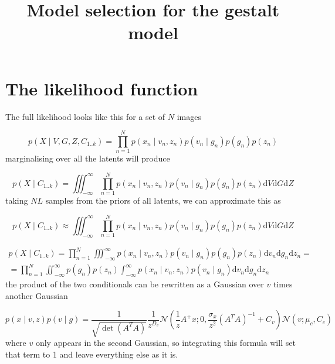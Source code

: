 \documentclass{paper}
\begin{document}
\title{Model selection for the gestalt model}
\maketitle

\section{The likelihood function}

The full likelihood looks like this for a set of $N$ images

\begin{equation}
p(X \mid V,G,Z,C_{1..k}) = \prod_{n=1}^N p(x_n \mid v_n,z_n) p(v_n \mid g_n) p(g_n) p(z_n)
\end{equation}
%
marginalising over all the latents will produce

\begin{equation}
p(X \mid C_{1..k}) = \iiint_{-\infty}^{\infty} \prod_{n=1}^N p(x_n \mid v_n,z_n) p(v_n \mid g_n) p(g_n) p(z_n) \mathrm{d}V\mathrm{d}G\mathrm{d}Z
\end{equation}
%
taking $NL$ samples from the priors of all latents, we can approximate this as

\begin{equation}
p(X \mid C_{1..k}) \approx \iiint_{-\infty}^{\infty} \prod_{n=1}^N p(x_n \mid v_n,z_n) p(v_n \mid g_n) p(g_n) p(z_n) \mathrm{d}V\mathrm{d}G\mathrm{d}Z
\end{equation}

\begin{equation}
\begin{split}
p(X \mid C_{1..k}) = \prod_{n=1}^N \iiint_{-\infty}^{\infty} p(x_n \mid v_n,z_n) p(v_n \mid g_n) p(g_n) p(z_n) \mathrm{d}v_n\mathrm{d}g_n\mathrm{d}z_n = \\
= \prod_{n=1}^N \iint_{-\infty}^{\infty}  p(g_n) p(z_n) \int_{-\infty}^{\infty} p(x_n \mid v_n,z_n) p(v_n \mid g_n) \mathrm{d}v_n\mathrm{d}g_n \mathrm{d}z_n
\end{split}
\end{equation}
%
the product of the two conditionals can be rewritten as a Gaussian over $v$ times another Gaussian

\begin{equation} 
p(x \mid v,z) p(v \mid g) = \frac{1}{\sqrt{\det(A^TA)}} \frac{1}{z^{D_v}} \mathcal{N}(\frac{1}{z}A^{+}x;0,\frac{\sigma_x}{z^2} (A^TA)^{-1} + C_v) \mathcal{N}(v; \mu_c,C_c)
\end{equation}
%
where $v$ only appears in the second Gaussian, so integrating this formula will set that term to 1 and leave everything else as it is.
\end{document}
